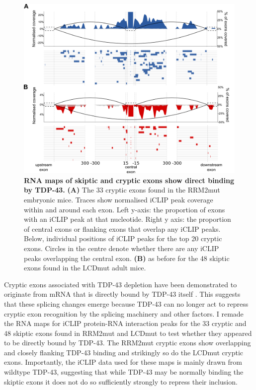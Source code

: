 \begin{figure}[h!]
	\centering
	\includegraphics[width=\textwidth]{Figures/05_tdp_mice/iclip_multipanel.png}
	\caption[RNA maps of skiptic and cryptic exons show direct binding by TDP-43]{
		\textbf{RNA maps of skiptic and cryptic exons show direct binding by TDP-43.}
	\textbf{(A)} The 33 cryptic exons found in the RRM2mut embryonic mice. Traces show normalised iCLIP peak coverage within and around each exon. Left y-axis: the proportion of exons with an iCLIP peak at that nucleotide. Right y axis: the proportion of central exons or flanking exons that overlap any iCLIP peaks. Below, individual positions of iCLIP peaks for the top 20 cryptic exons. Circles in the centre denote whether there are any iCLIP peaks overlapping the central exon. 
	\textbf{(B)} as before for the 48 skiptic exons found in the LCDmut adult mice.
}
	\label{iclip_multi}
\end{figure}

Cryptic exons associated with TDP-43 depletion have been demonstrated to originate from mRNA that is directly bound by TDP-43 itself \citep{Ling2015}. 
This suggests that these splicing changes emerge because TDP-43 can no longer act to repress cryptic exon recognition by the splicing machinery and other factors. 
I remade the RNA maps for iCLIP protein-RNA interaction peaks for the 33 cryptic and 48 skiptic exons found in RRM2mut and LCDmut to test whether they appeared to be directly bound by TDP-43. 
The RRM2mut cryptic exons show overlapping and closely flanking TDP-43 binding and strikingly so do the LCDmut cryptic exons. 
Importantly, the iCLIP data used for these maps is mainly drawn from wildtype TDP-43, suggesting that while TDP-43 may be normally binding the skiptic exons it does not do so sufficiently strongly to repress their inclusion. 

